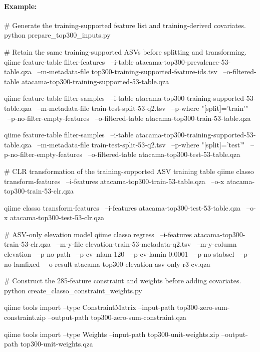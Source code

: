\documentclass[11pt,a4paper]{article}
\begin{document}
\paragraph{Example:} \mbox{}
\begin{PseudoCode}
# Generate the training-supported feature list and training-derived covariates.
python prepare_top300_inputs.py

# Retain the same training-supported ASVs before splitting and transforming.
qiime feature-table filter-features \
    --i-table atacama-top300-prevalence-53-table.qza \
    --m-metadata-file top300-training-supported-feature-ids.tsv \
    --o-filtered-table atacama-top300-training-supported-53-table.qza

qiime feature-table filter-samples \
    --i-table atacama-top300-training-supported-53-table.qza \
    --m-metadata-file train-test-split-53-q2.tsv \
    --p-where "[split]='train'" \
    --p-no-filter-empty-features \
    --o-filtered-table atacama-top300-train-53-table.qza

qiime feature-table filter-samples \
    --i-table atacama-top300-training-supported-53-table.qza \
    --m-metadata-file train-test-split-53-q2.tsv \
    --p-where "[split]='test'" \
    --p-no-filter-empty-features \
    --o-filtered-table atacama-top300-test-53-table.qza

# CLR transformation of the training-supported ASV training table
qiime classo transform-features \
    --i-features atacama-top300-train-53-table.qza \
    --o-x atacama-top300-train-53-clr.qza

qiime classo transform-features \
    --i-features atacama-top300-test-53-table.qza \
    --o-x atacama-top300-test-53-clr.qza

# ASV-only elevation model
qiime classo regress \
    --i-features atacama-top300-train-53-clr.qza \
    --m-y-file elevation-train-53-metadata-q2.tsv \
    --m-y-column elevation \
    --p-no-path \
    --p-cv--nlam 120 \
    --p-cv-lamin 0.0001 \
    --p-no-stabsel \
    --p-no-lamfixed \
    --o-result atacama-top300-elevation-asv-only-r3-cv.qza

# Construct the 285-feature constraint and weights before adding covariates.
python create_classo_constraint_weights.py

qiime tools import      --type ConstraintMatrix --input-path top300-zero-sum-constraint.zip      --output-path top300-zero-sum-constraint.qza

qiime tools import      --type Weights --input-path top300-unit-weights.zip      --output-path top300-unit-weights.qza


\end{PseudoCode}
\end{document}
